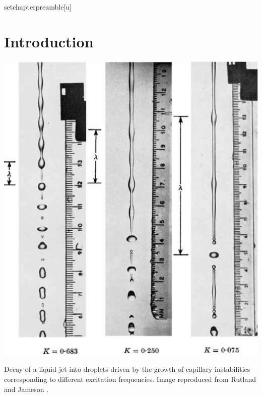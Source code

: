 setchapterpreamble[u]{\margintoc}
\chapter{Introduction} 

\begin{marginfigure}[1cm]
\centering
\includegraphics{plots/intro/jet.pdf}
\caption{Decay of a liquid jet into droplets driven by the growth of capillary instabilities corresponding 
	to different excitation frequencies. Image reproduced from Rutland and Jameson \cite{rutland1971non}.
	} 
\label{jet}
\end{marginfigure}


